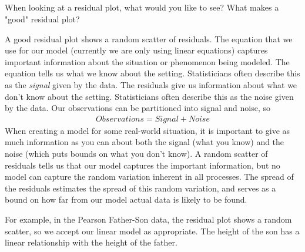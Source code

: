 \documentclass[10pt,]{book}
\theoremstyle{ptxdefinitionnotitle}
\theoremstyle{ptxdefinitiontitle}
\numberwithin{equation}{section}
\begin{document}
\subsection[{}]{}\label{subsection-3}
\hypertarget{p-100}{}%
When looking at a residual plot, what would you like to see?  What makes a "good" residual plot?%
\par
\hypertarget{p-101}{}%
A good residual plot shows a random scatter of residuals. The equation that we use for our model (currently we are only using linear equations) captures important information about the situation or phenomenon being modeled. The equation tells us what we know about the setting. Statisticians often describe this as the \emph{signal} given by the data. The residuals give us information about what we don’t know about the setting. Statisticians often describe this as the noise given by the data. Our observations can be partitioned into signal and noise, so%
\begin{gather*}
Observations = Signal + Noise
\end{gather*}
When creating a model for some real-world situation, it is important to give as much information as you can about both the signal (what you know) and the noise (which puts bounds on what you don’t know). A random scatter of residuals tells us that our model captures the important information, but no model can capture the random variation inherent in all processes. The spread of the residuals estimates the spread of this random variation, and serves as a bound on how far from our model actual data is likely to be found.%
\par
\hypertarget{p-102}{}%
For example, in the Pearson Father-Son data, the residual plot shows a random scatter, so we accept our linear model as appropriate.  The height of the son has a linear relationship with the height of the father. \leavevmode%
\end{document}
